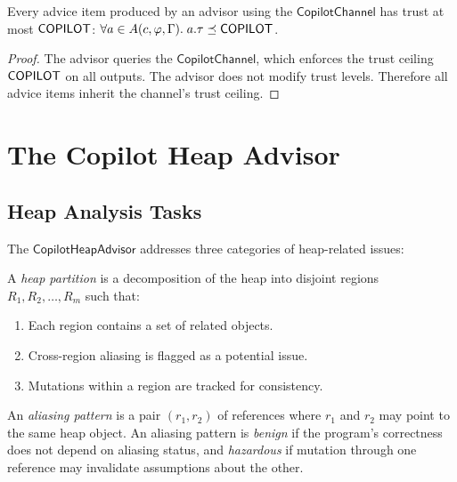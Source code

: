 \documentclass[11pt]{article}
\newcommand{\HeapAdv}{\mathsf{CopilotHeapAdvisor}}
\newcommand{\CopChan}{\mathsf{CopilotChannel}}
\begin{document}
\begin{lemma}
\label{lem:adv-trust}
Every advice item produced by an advisor using the $\CopChan$
has trust at most $\mathsf{COPILOT}$:
$\forall a \in A(c, \varphi, \Gamma).\; a.\tau \preceq \mathsf{COPILOT}$.
\end{lemma}

\begin{proof}
The advisor queries the $\CopChan$, which enforces the trust
ceiling $\mathsf{COPILOT}$ on all outputs.  The advisor does not
modify trust levels.  Therefore all advice items inherit the
channel's trust ceiling.
\end{proof}

\section{The Copilot Heap Advisor}
\label{sec:heap}

\subsection{Heap Analysis Tasks}
\label{sec:heap:tasks}

The $\HeapAdv$ addresses three categories of heap-related issues:

\begin{definition}
\label{def:heap-part}
A \emph{heap partition} is a decomposition of the heap into
disjoint regions $R_1, R_2, \ldots, R_m$ such that:
\begin{enumerate}
\item Each region contains a set of related objects.
\item Cross-region aliasing is flagged as a potential issue.
\item Mutations within a region are tracked for consistency.
\end{enumerate}
\end{definition}

\begin{definition}
\label{def:aliasing}
An \emph{aliasing pattern} is a pair $(r_1, r_2)$ of references
where $r_1$ and $r_2$ may point to the same heap object.  An
aliasing pattern is \emph{benign} if the program's correctness
does not depend on aliasing status, and \emph{hazardous} if
mutation through one reference may invalidate assumptions about
the other.
\end{definition}
\end{document}
